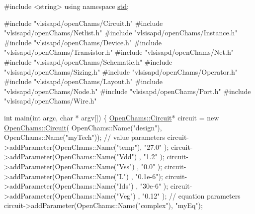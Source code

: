 \begin{DoxyCodeInclude}
\textcolor{preprocessor}{#include <string>}
\textcolor{keyword}{using namespace }\mbox{\hyperlink{namespacestd}{std}};

\textcolor{preprocessor}{#include "vlsisapd/openChams/Circuit.h"}
\textcolor{preprocessor}{#include "vlsisapd/openChams/Netlist.h"}
\textcolor{preprocessor}{#include "vlsisapd/openChams/Instance.h"}
\textcolor{preprocessor}{#include "vlsisapd/openChams/Device.h"}
\textcolor{preprocessor}{#include "vlsisapd/openChams/Transistor.h"}
\textcolor{preprocessor}{#include "vlsisapd/openChams/Net.h"}
\textcolor{preprocessor}{#include "vlsisapd/openChams/Schematic.h"}
\textcolor{preprocessor}{#include "vlsisapd/openChams/Sizing.h"}
\textcolor{preprocessor}{#include "vlsisapd/openChams/Operator.h"}
\textcolor{preprocessor}{#include "vlsisapd/openChams/Layout.h"}
\textcolor{preprocessor}{#include "vlsisapd/openChams/Node.h"}
\textcolor{preprocessor}{#include "vlsisapd/openChams/Port.h"}
\textcolor{preprocessor}{#include "vlsisapd/openChams/Wire.h"}

\textcolor{keywordtype}{int} main(\textcolor{keywordtype}{int} argc, \textcolor{keywordtype}{char} * argv[]) \{
    \mbox{\hyperlink{class_open_chams_1_1_circuit}{OpenChams::Circuit}}* circuit = \textcolor{keyword}{new} \mbox{\hyperlink{class_open_chams_1_1_circuit}{OpenChams::Circuit}}(
      OpenChams::Name(\textcolor{stringliteral}{"design"}), OpenChams::Name(\textcolor{stringliteral}{"myTech"}));
    \textcolor{comment}{// value parameters}
    circuit->addParameter(OpenChams::Name(\textcolor{stringliteral}{"temp"}), \textcolor{stringliteral}{"27.0"}  );
    circuit->addParameter(OpenChams::Name(\textcolor{stringliteral}{"Vdd"}) , \textcolor{stringliteral}{"1.2"}   );
    circuit->addParameter(OpenChams::Name(\textcolor{stringliteral}{"Vss"}) , \textcolor{stringliteral}{"0.0"}   );
    circuit->addParameter(OpenChams::Name(\textcolor{stringliteral}{"L"})   , \textcolor{stringliteral}{"0.1e-6"});
    circuit->addParameter(OpenChams::Name(\textcolor{stringliteral}{"Ids"}) , \textcolor{stringliteral}{"30e-6"} );
    circuit->addParameter(OpenChams::Name(\textcolor{stringliteral}{"Veg"}) , \textcolor{stringliteral}{"0.12"}  );
    \textcolor{comment}{// equation parameters}
    circuit->addParameter(OpenChams::Name(\textcolor{stringliteral}{"complex"}), \textcolor{stringliteral}{"myEq"});


\end{DoxyCodeInclude}
